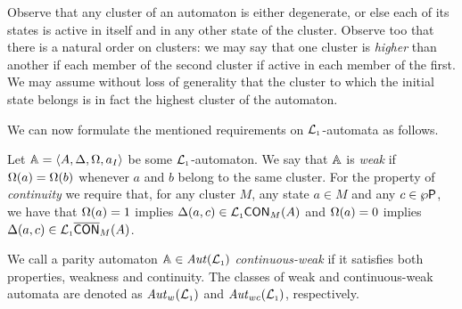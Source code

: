 Observe that any cluster of an automaton is either degenerate, or else each
of its states is active in itself and in any other state of the cluster.
Observe too that there is a natural order on clusters: we may say that one
cluster is \emph{higher} than another if each member of the second cluster
if active in each member of the first.
We may assume without loss of generality that the cluster to which the initial 
state belongs is in fact the highest cluster of the automaton.

We can now formulate the mentioned requirements on $\mathcal{L}_{\scriptscriptstyle 1}$-automata as follows.

\begin{definition}
\label{d:wk}
\label{d:ctwk}
Let $\mathbb{A} = \langle{A,\Delta,\Omega,a_I}\rangle$ be some $\mathcal{L}_{\scriptscriptstyle 1}$-automaton.
We say that $\mathbb{A}$ is \emph{weak} if $\Omega(a) = \Omega(b)$ whenever $a$ and $b$
belong to the same cluster.
For the property of \emph{continuity} we require that, for any cluster $M$, any
state $a \in M$ and any $c \in \wp\mathsf{P}$, we have that 
$\Omega(a) = 1$ implies $\Delta(a,c) \in \mathcal{L}_{\scriptscriptstyle 1}\mathsf{CON}_{M}(A)$
and 
$\Omega(a) = 0$ implies $\Delta(a,c) \in \mathcal{L}_{\scriptscriptstyle 1}\overline{\mathsf{CON}}_{M}(A)$.

We call a parity automaton $\mathbb{A} \in \mathit{Aut}(\mathcal{L}_{\scriptscriptstyle 1})$ \emph{continuous-weak} if it 
satisfies both properties, weakness and continuity.
The classes of weak and continuous-weak automata are denoted as $\mathit{Aut}_{w}(\mathcal{L}_{\scriptscriptstyle 1})$
and $\mathit{Aut}_{wc}(\mathcal{L}_{\scriptscriptstyle 1})$, respectively.
\end{definition}


